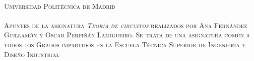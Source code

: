 \documentclass[11pt]{book} %
\makeatletter
\renewcommand{\cleardoublepage}{
\clearpage\ifodd\c@page\else
\hbox{}
\vspace*{\fill}
\thispagestyle{empty}
\newpage
\fi}
\numberwithin{dummy}{section}
\theoremstyle{ocrenumbox}
\theoremstyle{blacknumex}
\theoremstyle{blacknumbox}
\theoremstyle{ocrenum}
\newcommand{\thechapterimage}{}%
\newcommand{\chapterimage}[1]{\renewcommand{\thechapterimage}{#1}}%
\makeatother
\begin{document}
	
	
	\newpage
	~\vfill
	\thispagestyle{empty}
	
	\noindent \textsc{Universidad Politécnica de Madrid}\\
	
	\noindent \href{}\\ %
	
	\noindent \textsc{Apuntes de la asignatura \emph{Teoría de circuitos} realizados por Ana Fernández Guillamón y	Oscar Perpiñán Lamigueiro. Se trata de una asignatura común a todos los Grados impartidos en la Escuela Técnica Superior de Ingeniería y Diseño Industrial}\\ %
	
	
	
	\chapterimage{indice.jpg} %
	
	\pagestyle{empty} %
	
	\tableofcontents %
	
	
	\pagestyle{fancy} %
	
	
\end{document}
